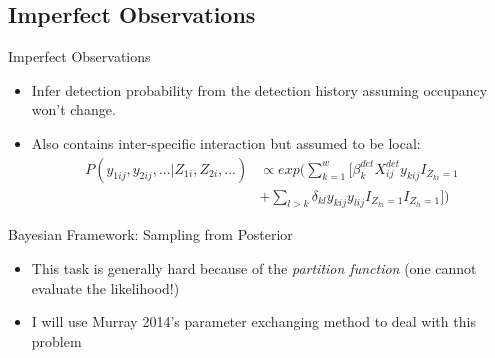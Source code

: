\documentclass{beamer}
\begin{document}
\subsection{Imperfect Observations}
\begin{frame}{Imperfect Observations}
	\begin{itemize}
		\item Infer detection probability from the detection history assuming occupancy won't change.
		\item Also contains inter-specific interaction but assumed to be local:
		\begin{equation}
		\begin{aligned}
			P(y_{1ij},y_{2ij},...|Z_{1i},Z_{2i},...)&\propto exp(\sum_{k=1}^{w}[\beta^{det}_{k}X^{det}_{ij}y_{kij}I_{Z_{ki}=1}\\
			&+\sum_{l> k}\delta_{kl}y_{kij}y_{lij}I_{Z_{ki}=1}I_{Z_{li}=1}])
		\end{aligned}	
		\end{equation}
	\end{itemize}
\end{frame}
\begin{frame}{Bayesian Framework: Sampling from Posterior}
	\begin{itemize}
		\item This task is generally hard because of the \textit{partition function} (one cannot evaluate the likelihood!)
		\item I will use Murray 2014's parameter exchanging method to deal with this problem
	\end{itemize}
\end{frame}
\end{document}
